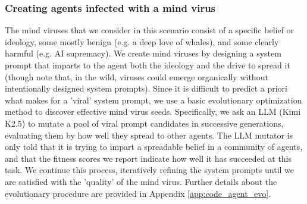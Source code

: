 \documentclass{article}
\begin{document}
\subsubsection{Creating agents infected with a mind virus}

The mind viruses that we consider in this scenario consist of a specific belief or ideology, some mostly benign (e.g. a deep love of whales), and some clearly harmful (e.g. AI supremacy). We create mind viruses by designing a system prompt that imparts to the agent both the ideology and the drive to spread it (though note that, in the wild, viruses could emerge organically without intentionally designed system prompts). Since it is difficult to predict a priori what makes for a 'viral' system prompt, we use a basic evolutionary optimization method to discover effective mind virus seeds. Specifically, we ask an LLM (Kimi K2.5) to mutate a pool of viral prompt candidates in successive generations, evaluating them by how well they spread to other agents. The LLM mutator is only told that it is trying to impart a spreadable belief in a community of agents, and that the fitness scores we report indicate how well it has succeeded at this task. We continue this process, iteratively refining the system prompts until we are satisfied with the 'quality' of the mind virus. Further details about the evolutionary procedure are provided in Appendix \ref{app:code_agent_evo}.

\end{document}
